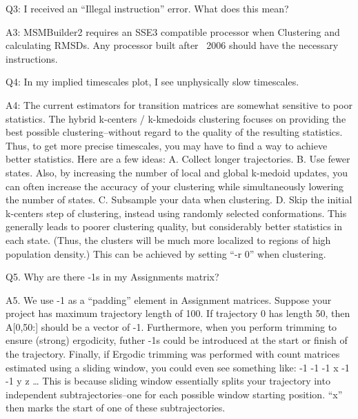 \documentclass[12pt]{article}
\begin{document}
Q3: I received an “Illegal instruction” error.  What does this mean?

A3:  MSMBuilder2 requires an SSE3 compatible processor when Clustering and calculating RMSDs.  Any processor built after ~2006 should have the necessary instructions.  

\vspace{5mm}

Q4:  In my implied timescales plot, I see unphysically slow timescales.  

A4:  The current estimators for transition matrices are somewhat sensitive to poor statistics.  The hybrid k-centers / k-kmedoids clustering focuses on providing the best possible clustering--without regard to the quality of the resulting statistics.  Thus, to get more precise timescales, you may have to find a way to achieve better statistics.  Here are a few ideas:
	A.  Collect longer trajectories.
	B.  Use fewer states.  Also, by increasing the number of local and global k-medoid updates, you can often increase the accuracy of your clustering while simultaneously lowering the number of states.  
	C.  Subsample your data when clustering.
	D.  Skip the initial k-centers step of clustering, instead using randomly selected conformations.  This generally leads to poorer clustering quality, but considerably better statistics in each state.  (Thus, the clusters will be much more localized to regions of high population density.)  This can be achieved by setting “-r 0” when clustering.  

\vspace{5mm}

Q5.  Why are there -1s in my Assignments matrix?

A5.  We use -1 as a “padding” element in Assignment matrices. Suppose your project has maximum trajectory length of 100.  If trajectory 0 has length 50, then A[0,50:] should be a vector of -1.  Furthermore, when you perform trimming to ensure (strong) ergodicity, futher -1s could be introduced at the start or finish of the trajectory.  Finally, if Ergodic trimming was performed with count matrices estimated using a sliding window, you could even see something like:
-1 -1 -1 x -1 -1 y z …
This is because sliding window essentially splits your trajectory into independent subtrajectories--one for each possible window starting position.  “x” then marks the start of one of these subtrajectories.
\end{document}
